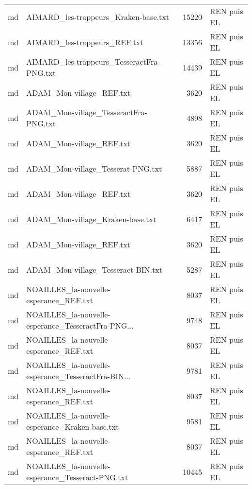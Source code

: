 \begin{tabular}{llrl}
    md &               AIMARD\_les-trappeurs\_Kraken-base.txt &                 15220 & REN puis EL \\
    md &                       AIMARD\_les-trappeurs\_REF.txt &                 13356 & REN puis EL \\
    md &          AIMARD\_les-trappeurs\_TesseractFra-PNG.txt &                 14439 & REN puis EL \\
    md &                           ADAM\_Mon-village\_REF.txt &                  3620 & REN puis EL \\
    md &              ADAM\_Mon-village\_TesseractFra-PNG.txt &                  4898 & REN puis EL \\
    md &                           ADAM\_Mon-village\_REF.txt &                  3620 & REN puis EL \\
    md &                  ADAM\_Mon-village\_Tesserat-PNG.txt &                  5887 & REN puis EL \\
    md &                           ADAM\_Mon-village\_REF.txt &                  3620 & REN puis EL \\
    md &                   ADAM\_Mon-village\_Kraken-base.txt &                  6417 & REN puis EL \\
    md &                           ADAM\_Mon-village\_REF.txt &                  3620 & REN puis EL \\
    md &                 ADAM\_Mon-village\_Tesseract-BIN.txt &                  5287 & REN puis EL \\
    md &             NOAILLES\_la-nouvelle-esperance\_REF.txt &                  8037 & REN puis EL \\
    md & NOAILLES\_la-nouvelle-esperance\_TesseractFra-PNG... &                  9748 & REN puis EL \\
    md &             NOAILLES\_la-nouvelle-esperance\_REF.txt &                  8037 & REN puis EL \\
    md & NOAILLES\_la-nouvelle-esperance\_TesseractFra-BIN... &                  9781 & REN puis EL \\
    md &             NOAILLES\_la-nouvelle-esperance\_REF.txt &                  8037 & REN puis EL \\
    md &     NOAILLES\_la-nouvelle-esperance\_Kraken-base.txt &                  9581 & REN puis EL \\
    md &             NOAILLES\_la-nouvelle-esperance\_REF.txt &                  8037 & REN puis EL \\
    md &   NOAILLES\_la-nouvelle-esperance\_Tesseract-PNG.txt &                 10445 & REN puis EL \\

\end{tabular}
